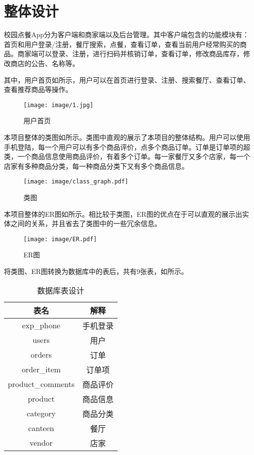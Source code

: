 \documentclass[lang=cn,a4paper,chinesefont=founder,bibend=bibtex]{shu-lab-report}
\begin{document}
\section{整体设计}

校园点餐App分为客户端和商家端以及后台管理。其中客户端包含的功能模块有：首页和用户登录/注册，餐厅搜索，点餐，查看订单，查看当前用户经常购买的商品。商家端可以登录、注册，进行扫码并核销订单，查看订单，修改商品库存，修改商店的公告、名称等。

其中，用户首页如所示，用户可以在首页进行登录、注册、搜索餐厅、查看订单、查看推荐商品等操作。

\begin{figure}[htbp]
  \centering
  \texttt{[image: image/1.jpg]}
  \caption{用户首页}
  \label{fig:1}
\end{figure}

\newpage

本项目整体的类图如所示。类图中直观的展示了本项目的整体结构。用户可以使用手机登陆，每一个用户可以有多个商品评价，点多个商品订单。订单是订单项的超类，一个商品信息使用商品评价，有着多个订单。每一家餐厅又多个店家，每一个店家有多种商品分类，每一种商品分类下又有多个商品信息。

\begin{figure}[htbp]
  \centering
  \texttt{[image: image/class\_graph.pdf]}
  \caption{类图}
  \label{fig:class-graph}
\end{figure}

\newpage

本项目整体的ER图如所示。相比较于类图，ER图的优点在于可以直观的展示出实体之间的关系，并且省去了类图中的一些冗余信息。

\begin{figure}[htbp]
  \centering
  \texttt{[image: image/ER.pdf]}
  \caption{ER图}
  \label{fig:er-graph}
\end{figure}


将类图、ER图转换为数据库中的表后，共有9张表，如所示。

\begin{longtable}[c]{@{}cc@{}}
  \caption{数据库表设计}
  \label{tab:my-table}            \\
  \toprule
  \textbf{表名}       & \textbf{解释} \\* \midrule
  \endhead
  \bottomrule
  \endfoot
  \endlastfoot
  exp\_phone        & 手机登录        \\
  users             & 用户          \\
  orders            & 订单          \\
  order\_item       & 订单项         \\
  product\_comments & 商品评价        \\
  product           & 商品信息        \\
  category          & 商品分类        \\
  canteen           & 餐厅          \\
  vendor            & 店家          \\* \bottomrule
\end{longtable}
\end{document}
